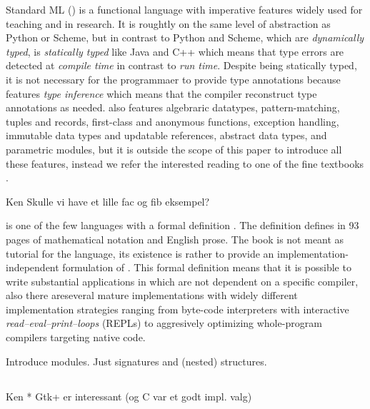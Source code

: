 \documentclass[workingdraft,endnotes]{usetex-v1}
\begin{document}
Standard ML (\sml) is a functional language with imperative features
widely used for teaching and in research.  It is roughtly on the same
level of abstraction as Python or Scheme, but in contrast to Python
and Scheme, which are \emph{dynamically typed}, is \sml
\emph{statically typed} like Java and C++ which means that type errors
are detected at \emph{compile time} in contrast to \emph{run time}.
Despite \sml being statically typed, it is not necessary for the
programmaer to provide type annotations because \sml features
\emph{type inference} which means that the compiler reconstruct type
annotations as needed.  \sml also features algebraric datatypes,
pattern-matching, tuples and records, first-class and anonymous
functions, exception handling, immutable data types and updatable
references, abstract data types, and parametric modules, but it is
outside the scope of this paper to introduce all these features,
instead we refer the interested reading to one of the fine textbooks
\cite{Hansen-Rischel:1999,Paulson:1996}.

\begin{ednote}{Ken}
  Skulle vi have et lille fac og fib eksempel?
\end{ednote}

\sml is one of the few languages with a formal definition
\cite{Milner:1997:Definition}.  The definition defines \sml in 93
pages of mathematical notation and English prose.  The book is not
meant as tutorial for the language, its existence is rather to provide
an implementation-independent formulation of \sml.  This formal
definition means that it is possible to write substantial applications
in \sml which are not dependent on a specific compiler, also there
areseveral mature \sml implementations with widely different
implementation strategies ranging from byte-code interpreters with
interactive \emph{read--eval--print--loops} (REPLs) to aggresively
optimizing whole-program compilers targeting native code.


\begin{ednote}{}
  Introduce modules.  Just signatures and (nested) structures.
\end{ednote}


\subsection{\gtk}
\label{sec:gtk}


\begin{ednote}{Ken}
  * Gtk+ er interessant (og C var et godt
    impl. valg)  
\end{ednote}
  
\end{document}
